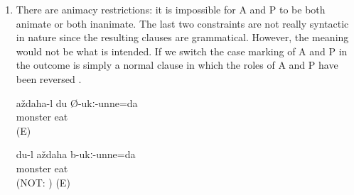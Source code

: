 \begin{enumerate}
	\item	There are animacy restrictions: it is impossible for A and P to be both animate or both inanimate. The last two constraints are not really syntactic in nature since the resulting clauses are grammatical. However, the meaning would not be what is intended. If we switch the case marking of A and P in  the outcome is simply a normal clause in which the roles of A and P have been reversed . 
	\begin{exe}
		\ex	\label{ex:The monster and me are eating each other}
		\begin{xlist}
			\ex	\label{ex:The monster is eating me}
			\gll	aždaha-l	du	Ø-ukː-unne=da\\
				monster		eat\\
			\glt	{} (E)
	
			\ex	\label{ex:I am eating the monster.}
			\gll	du-l	aždaha	b-ukː-unne=da\\
					monster	eat\\
			\glt	{} (NOT: ) (E)
		\end{xlist}
	\end{exe}
\end{enumerate}


